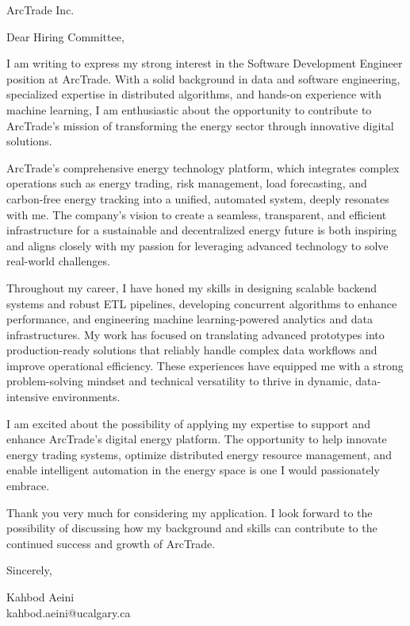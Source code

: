 \documentclass[11pt]{letter}
\begin{document}
\begin{letter}{
    ArcTrade Inc.
}

\opening{Dear Hiring Committee,}

I am writing to express my strong interest in the Software Development Engineer position at ArcTrade. With a solid background in data and software engineering, specialized expertise in distributed algorithms, and hands-on experience with machine learning, I am enthusiastic about the opportunity to contribute to ArcTrade's mission of transforming the energy sector through innovative digital solutions.

ArcTrade's comprehensive energy technology platform, which integrates complex operations such as energy trading, risk management, load forecasting, and carbon-free energy tracking into a unified, automated system, deeply resonates with me. The company's vision to create a seamless, transparent, and efficient infrastructure for a sustainable and decentralized energy future is both inspiring and aligns closely with my passion for leveraging advanced technology to solve real-world challenges.

Throughout my career, I have honed my skills in designing scalable backend systems and robust ETL pipelines, developing concurrent algorithms to enhance performance, and engineering machine learning-powered analytics and data infrastructures. My work has focused on translating advanced prototypes into production-ready solutions that reliably handle complex data workflows and improve operational efficiency. These experiences have equipped me with a strong problem-solving mindset and technical versatility to thrive in dynamic, data-intensive environments.

I am excited about the possibility of applying my expertise to support and enhance ArcTrade's digital energy platform. The opportunity to help innovate energy trading systems, optimize distributed energy resource management, and enable intelligent automation in the energy space is one I would passionately embrace.

Thank you very much for considering my application. I look forward to the possibility of discussing how my background and skills can contribute to the continued success and growth of ArcTrade.

\closing{Sincerely,}
Kahbod Aeini \\
kahbod.aeini@ucalgary.ca \\

\end{letter}
\end{document}
